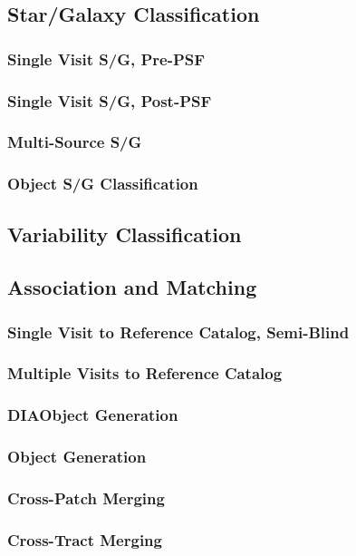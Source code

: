 \subsection{Star/Galaxy Classification}
\subsubsection{Single Visit S/G, Pre-PSF}
\subsubsection{Single Visit S/G, Post-PSF}
\subsubsection{Multi-Source S/G}
\subsubsection{Object S/G Classification}

\subsection{Variability Classification}

\subsection{Association and Matching}
\subsubsection{Single Visit to Reference Catalog, Semi-Blind}
\subsubsection{Multiple Visits to Reference Catalog}
\subsubsection{DIAObject Generation}
\subsubsection{Object Generation}
\subsubsection{Cross-Patch Merging}
\subsubsection{Cross-Tract Merging}
